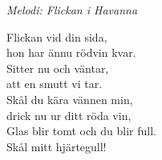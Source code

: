 {\footnotesize\textit{Melodi: Flickan i Havanna}}\par
\vspace{10pt}
Flickan vid din sida,\\
hon har ännu rödvin kvar.\\
Sitter nu och väntar,\\
att en smutt vi tar. \\
Skål du kära vännen min, \\
drick nu ur ditt röda vin,\\
Glas blir tomt och du blir full.\\
Skål mitt hjärtegull!
